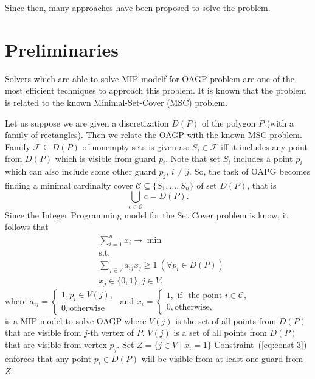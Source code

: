 \documentclass[runningheads,a4paper]{llncs}
\begin{document}
     Since then, many approaches have been proposed to solve the problem.
     \section{Preliminaries}
     Solvers which are able to solve MIP modelf for OAGP problem are one of the most efficient techniques to approach this problem. It is known that the problem is related to the known Minimal-Set-Cover (MSC) problem. 

     Let us suppose we are given a discretization $D(P)$ of the polygon $P$ (with a family of rectangles). Then we relate the OAGP with the known MSC problem.  
     Family $\mathcal{F}\subseteq D(P)$ of nonempty sets is given as: $S_i \in \mathcal{F}$ iff it includes any point from $D(P)$ which is visible from guard $p_i$. Note that set $S_i$ includes a point $p_i$ which can also include some other guard $p_j$, $i \neq j$. So, the task of OAPG becomes finding a minimal cardinalty cover $\mathcal{C}\subseteq\{S_1,...,S_n\}$ of set $D(P)$, that is 
     $$ \bigcup_{c \in \mathcal{C}} c = D(P).$$ Since the Integer Programming model for the Set Cover problem is know, it follows that 
     \begin{align}
        &\sum_{i=1}^n x_i \longrightarrow \min \\
        &\mbox{s.t.} \\
        &\sum_{j\in V} a_{ij}x_j \geq 1\ (\forall p_i\in D(P)) \label{eq:const-3}\\
        & x_j \in \{0,1\}, j \in V,
     \end{align}
     where 
     $a_{ij} = \begin{cases}
          1, p_i \in V(j), \\
          0, \mbox{otherwise} 
     \end{cases}$ 
     and $x_i = \begin{cases}
     	 1, \mbox{ if } \mbox{ the point } i \in \mathcal{C},\\
     	 0, \mbox{otherwise},
     \end{cases}$ \\
      is a MIP model to solve OAGP where $V(j)$ is the set of all points from $D(P)$ that are visible from $j$-th vertex of $P$.
     $V(j)$ is a set of all points from $D(P)$ that are visible from vertex $p_j$. Set $Z = \{j \in V\mid x_i=1\}$
     Constraint~(\ref{eq:const-3}) enforces that any point $p_i \in D(P)$ will be visible from at least one guard from $Z$.
     
\end{document}
